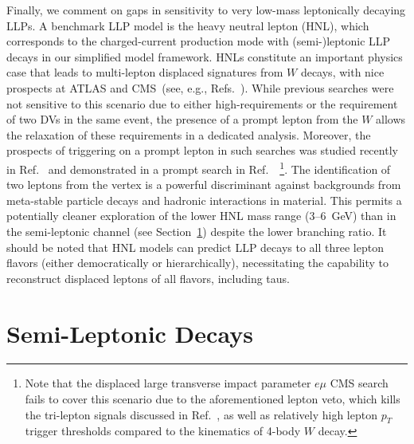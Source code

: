 Finally, we comment on gaps in sensitivity to very low-mass leptonically decaying LLPs. A benchmark LLP model is the heavy neutral lepton (HNL), which corresponds to the charged-current production mode with (semi-)leptonic LLP decays in our simplified model framework. HNLs constitute an important physics case that leads to multi-lepton displaced signatures from $W$ decays, with nice prospects at ATLAS and CMS~(see, e.g., Refs.~\cite{Izaguirre2015,Nemevsek:2018bbt,Cottin:2018kmq}). While previous searches were not sensitive to this scenario due to either high-\pT requirements or the requirement of two DVs in the same event, the presence of a prompt lepton from the $W$ allows the relaxation of these requirements in a dedicated analysis.  Moreover, the prospects of triggering on a prompt lepton in such searches was studied recently in Ref.~\cite{Cottin:2018kmq} and demonstrated in a prompt search in Ref.~\cite{Sirunyan:2018mtv}~\footnote{Note that the displaced large transverse impact parameter $e\mu$ CMS search~\cite{CMS-PAS-EXO-16-022} fails to cover this scenario due to the aforementioned lepton veto, which kills the tri-lepton signals discussed in Ref.~\cite{Izaguirre2015}, as well as relatively high lepton $p_T$ trigger thresholds compared to the kinematics of 4-body $W$ decay.}. The identification of two leptons from the vertex is a powerful discriminant against backgrounds from meta-stable particle decays and hadronic interactions in material. This permits a potentially cleaner exploration of the lower HNL mass range (3--6~GeV) than in the semi-leptonic channel (see Section~\ref{subsec:dsemilep}) despite the lower branching ratio. It should be noted that HNL models can predict LLP decays to all three lepton flavors (either democratically or hierarchically), necessitating the capability to reconstruct displaced leptons of all flavors, including taus.

\section{Semi-Leptonic Decays}
\label{subsec:dsemilep}

